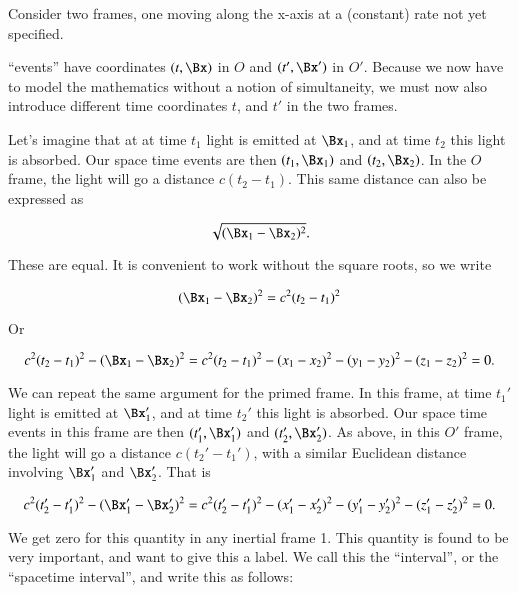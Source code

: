 Consider two frames, one moving along the x-axis at a (constant) rate not yet specified.

``events'' have coordinates $(t, \Bx)$ in $O$ and $(t', \Bx')$ in $O'$.  Because we now have to model the mathematics without a notion of simultaneity, we must now also introduce different time coordinates $t$, and $t'$ in the two frames.  

Let's imagine that at at time $t_1$ light is emitted at $\Bx_1$, and at time $t_2$ this light is absorbed.  Our space time events are then $(t_1, \Bx_1)$ and $(t_2, \Bx_2)$.  In the $O$ frame, the light will go a distance $c(t_2 - t_1)$.  This same distance can also be expressed as

\begin{equation}\label{eqn:relativisticElectrodynamicsL2:10}
\sqrt{ (\Bx_1 - \Bx_2)^2}.
\end{equation}

These are equal.  It is convenient to work without the square roots, so we write

\begin{equation}\label{eqn:relativisticElectrodynamicsL2:20}
(\Bx_1 - \Bx_2)^2 = c^2 (t_2 - t_1)^2
\end{equation}

Or

\begin{equation}\label{eqn:relativisticElectrodynamicsL2:30}
c^2 (t_2 - t_1)^2 - (\Bx_1 - \Bx_2)^2 =
c^2 (t_2 - t_1)^2 
- (x_1 - x_2)^2
- (y_1 - y_2)^2
- (z_1 - z_2)^2 = 0.
\end{equation}

We can repeat the same argument for the primed frame.  In this frame, at time $t_1'$ light is emitted at $\Bx_1'$, and at time $t_2'$ this light is absorbed.  Our space time events in this frame are then $(t_1', \Bx_1')$ and $(t_2', \Bx_2')$.  As above, in this $O'$ frame, the light will go a distance $c(t_2' - t_1')$, with a similar Euclidean distance involving $\Bx_1'$ and $\Bx_2'$.  That is

\begin{equation}\label{eqn:relativisticElectrodynamicsL2:40}
c^2 (t_2' - t_1')^2 - (\Bx_1' - \Bx_2')^2 =
c^2 (t_2' - t_1')^2 
- (x_1' - x_2')^2
- (y_1' - y_2')^2
- (z_1' - z_2')^2 = 0.
\end{equation}

We get zero for this quantity in any inertial frame 1.  This quantity is found to be very important, and want to give this a label.  We call this the ``interval'', or the ``spacetime interval'', and write this as follows:

